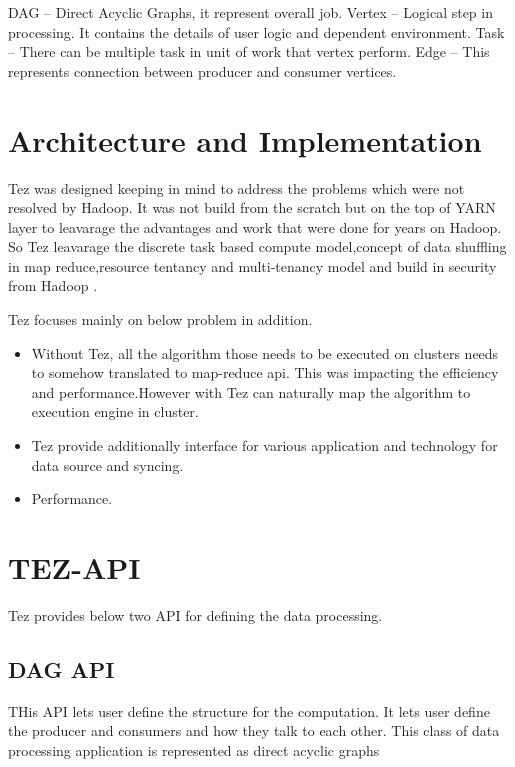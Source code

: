 \documentclass[9pt,twocolumn,twoside]{styles/osajnl}
\begin{document}
 DAG -- Direct Acyclic Graphs, it represent overall job.  
 Vertex -- Logical step in processing. It contains the details of user logic and dependent environment.
 Task --   There can be multiple task in unit of work that vertex perform. 
 Edge --  This represents connection between producer and consumer vertices.


\section{Architecture and Implementation}

Tez was designed keeping in mind to address the problems which were not resolved by Hadoop. 
It was not build from the scratch but on the top of YARN layer to leavarage the 
advantages and work that were done for years on Hadoop. So Tez leavarage the discrete task based compute model,concept of data shuffling in map reduce,resource tentancy and
multi-tenancy model and build in security from Hadoop . 

Tez focuses mainly on below problem in addition.

\begin{itemize}
\item Without Tez, all the algorithm those needs to be executed on clusters needs to somehow translated to map-reduce api. This was impacting the efficiency and performance.However with Tez can naturally map the algorithm to execution engine in cluster.
        
\item Tez provide additionally interface for various application and technology for data source and syncing.

\item Performance.
\end{itemize}	


\section{TEZ-API}

Tez provides below two API for defining the data processing. 

\subsection{ DAG API}
	THis API lets user define the structure for the computation.
	It lets user define the producer and consumers and how they talk to each other.
	This class of data processing application is represented as direct acyclic graphs 	
\end{document}
